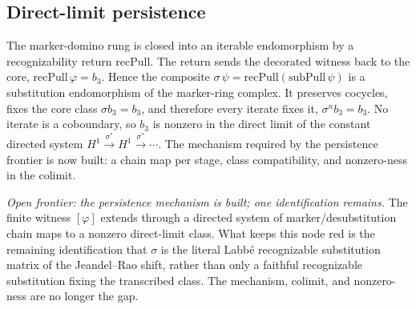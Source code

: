\subsection{Direct-limit persistence}

\begin{theorem}\label{thm:jeandel-rao-substitution-tower}\leanok{}
The marker-domino rung is closed into an iterable endomorphism by a
recognizability return $\mathrm{recPull}$. The return sends the decorated
witness back to the core, $\mathrm{recPull}\,\varphi=b_3$. Hence the composite
$\sigma\,\psi=\mathrm{recPull}(\mathrm{subPull}\,\psi)$ is a substitution
endomorphism of the marker-ring complex. It preserves cocycles, fixes the core
class $\sigma b_3=b_3$, and therefore every iterate fixes it,
$\sigma^n b_3=b_3$. No iterate is a coboundary, so $b_3$ is nonzero in the
direct limit of the constant directed system
$H^1 \xrightarrow{\sigma^\ast} H^1 \xrightarrow{\sigma^\ast}\cdots$. The
mechanism required by the persistence frontier is now built: a chain map per
stage, class compatibility, and nonzero-ness in the colimit.
\end{theorem}

\begin{theorem}\label{thm:jeandel-rao-persistence}\notready{}
\emph{Open frontier: the persistence mechanism is built; one identification
remains.} The finite witness $[\varphi]$ extends through a directed system of
marker/desubstitution chain maps to a nonzero direct-limit class. What keeps
this node red is the remaining identification that $\sigma$ is the literal
Labb\'e recognizable substitution matrix of the Jeandel--Rao shift, rather
than only a faithful recognizable substitution fixing the transcribed class.
The mechanism, colimit, and nonzero-ness are no longer the gap.
\end{theorem}
